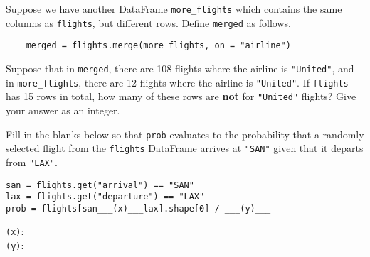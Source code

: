 \documentclass[twoside,12pt]{article}
\begin{document}
\begin{probset}
\begin{prob}
\begin{subprobset}
\begin{subprob}

\end{subprob}
  
\end{subprobset}

\end{prob}
\newpage
\vspace{-0.2in}
\begin{prob}

Suppose we have another DataFrame \texttt{more\_flights} which contains the same columns as \texttt{flights}, but different rows. Define \texttt{merged} as follows.

\begin{verbatim}
    merged = flights.merge(more_flights, on = "airline")
\end{verbatim}  
Suppose that in \texttt{merged}, there are 108 flights where the airline is \texttt{"United"}, and in \texttt{more\_flights}, there are 12 flights where the airline is \texttt{"United"}. If \texttt{flights} has 15 rows in total, how many of these rows are \textbf{not} for \texttt{"United"} flights? Give your answer as an integer.
\begin{center}
\end{center}




\end{prob}

\vspace{-0.2in}
\begin{prob}

\begin{subprobset}

\begin{subprob}
Fill in the blanks below so that \texttt{prob} evaluates to the probability that a randomly selected flight from the \texttt{flights} DataFrame arrives at \texttt{"SAN"} given that it departs from \texttt{"LAX"}.

\begin{verbatim}
san = flights.get("arrival") == "SAN"
lax = flights.get("departure") == "LAX"
prob = flights[san___(x)___lax].shape[0] / ___(y)___
\end{verbatim}

\texttt{(x)}: \inlineresponsebox[5.85in]{\texttt{\&}}{}\\
\texttt{(y)}: 


\end{subprob}
\end{subprobset}
\end{prob}
\end{probset}
\end{document}
